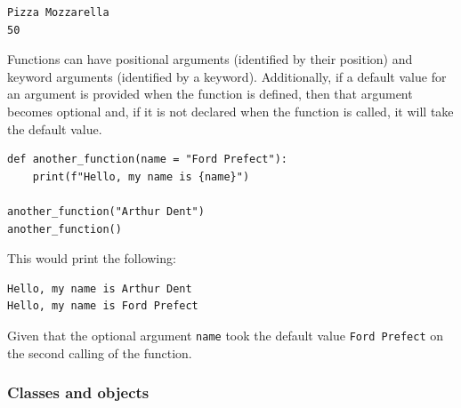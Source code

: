 \documentclass[a4paper,12pt]{article}
\begin{document}
\begin{tcolorbox}[
    enhanced,
    attach boxed title to top left={xshift=6mm,yshift=-3mm},
    colback=lightgray!20,
    colframe=lightgray,
    colbacktitle=lightgray,
    title=Output,
    fonttitle=\bfseries\color{black},
    boxed title style={size=small,colframe=lightgray,sharp corners},
    sharp corners,
    ]
    \begin{verbatim}
Pizza Mozzarella
50
    \end{verbatim}
\end{tcolorbox}

Functions can have positional arguments (identified by their position) and keyword arguments (identified by a keyword). Additionally, if a default value for an argument is provided when the function is defined, then that argument becomes optional and, if it is not declared when the function is called, it will take the default value.

\begin{tcolorbox}[
    enhanced,
    attach boxed title to top left={xshift=6mm,yshift=-3mm},
    colback=lightgreen!20,
    colframe=lightgreen,
    colbacktitle=lightgreen,
    title=Python,
    fonttitle=\bfseries\color{black},
    boxed title style={size=small,colframe=lightgreen,sharp corners},
    sharp corners,
    ]
    \begin{verbatim}
def another_function(name = "Ford Prefect"):
    print(f"Hello, my name is {name}")

another_function("Arthur Dent")
another_function()
    \end{verbatim}
\end{tcolorbox}

This would print the following:

\begin{tcolorbox}[
    enhanced,
    attach boxed title to top left={xshift=6mm,yshift=-3mm},
    colback=lightgray!20,
    colframe=lightgray,
    colbacktitle=lightgray,
    title=Output,
    fonttitle=\bfseries\color{black},
    boxed title style={size=small,colframe=lightgray,sharp corners},
    sharp corners,
    ]
    \begin{verbatim}
Hello, my name is Arthur Dent
Hello, my name is Ford Prefect
    \end{verbatim}
\end{tcolorbox}
Given that the optional argument \verb|name| took the default value \verb|Ford Prefect| on the second calling of the function.

\subsubsection{Classes and objects}
\end{document}
